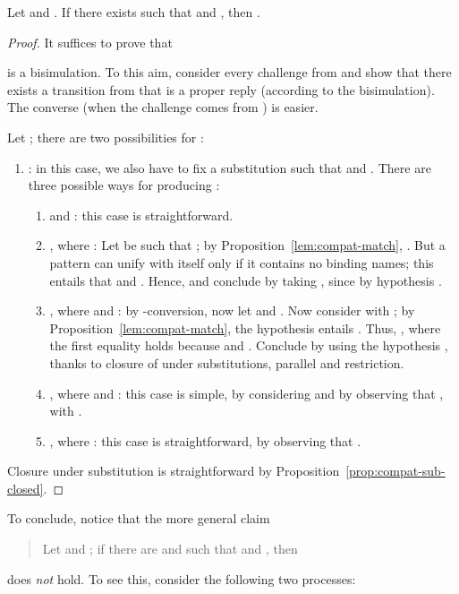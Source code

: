 \documentclass{LMCS}
\begin{document}
\begin{prop}
\label{eq-grrr}
Let  and .
If there exists  such that  and , 
then .
\end{prop}
\begin{proof}
It suffices to prove that

is a bisimulation. To this aim, consider every challenge from  and show that
there exists a transition from  that is a proper reply (according to the bisimulation). 
The converse (when the challenge comes from ) is easier.

Let ; there are two possibilities for :
\begin{enumerate}
\item : in this case, we also have to fix a substitution  such that
 and . 
There are three possible ways for producing :
	\begin{enumerate}[label={\alph*}]
	\item  and : this case is straightforward.

	\item , where :
	Let  be such that ; by Proposition~\ref{lem:compat-match},
	. But a pattern can unify with itself only if it
    contains no binding names;
    this entails that  and .
	Hence,  and conclude by
	taking , since by hypothesis .

	\item , where  and 
	: by -conversion, now let 
	and . Now consider  with 
	; by Proposition~\ref{lem:compat-match}, the hypothesis
	 entails . 
	Thus, ,
	where the first equality holds because  
	and . Conclude by using the hypothesis ,
	thanks to closure of  under substitutions, parallel and restriction.

	\item , where  and 
	: this case is simple, by considering 
	 and by observing that 
	, with .

	\item , where :
	this case is straightforward, by observing that .
	\end{enumerate}
\end{enumerate}
Closure under substitution is straightforward by Proposition~\ref{prop:compat-sub-closed}.
\end{proof}

To conclude, notice that the more general claim
\begin{quote}
Let  and ; if there are 
and  such that  and
, then 
\end{quote}
does {\em not} hold. To see this, consider the following two processes:
\end{document}
